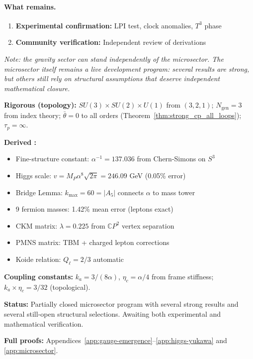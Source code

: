 \paragraph{What remains.}
\begin{enumerate}
\item \textbf{Experimental confirmation:} LPI test, clock anomalies, $T^3$ phase
\item \textbf{Community verification:} Independent review of derivations
\end{enumerate}

\textit{Note: the gravity sector can stand independently of the microsector.  The microsector itself remains a live development program: several results are strong, but others still rely on structural assumptions that deserve independent mathematical closure.}

\begin{tcolorbox}[colback=green!5!white, colframe=green!60!black, title=Summary: Gauge Extension and Microsector ]
\textbf{Rigorous (topology):} $SU(3) \times SU(2) \times U(1)$ from $(3,2,1)$; $N_{\text{gen}} = 3$ from index theory; $\bar{\theta} = 0$ to all orders (Theorem~\ref{thm:strong_cp_all_loops}); $\tau_p = \infty$.

\textbf{Derived :}
\begin{itemize}[nosep]
\item Fine-structure constant: $\alpha^{-1} = 137.036$ from Chern-Simons on $S^3$
\item Higgs scale: $v = M_P \alpha^8 \sqrt{2\pi} = 246.09$ GeV (0.05\% error)
\item Bridge Lemma: $k_{\max} = 60 = |A_5|$ connects $\alpha$ to mass tower
\item 9 fermion masses: 1.42\% mean error (leptons exact)
\item CKM matrix: $\lambda = 0.225$ from $\mathbb{C}P^2$ vertex separation
\item PMNS matrix: TBM + charged lepton corrections
\item Koide relation: $Q_\ell = 2/3$ automatic
\end{itemize}

\textbf{Coupling constants:} $k_a = 3/(8\alpha)$, $\eta_c = \alpha/4$ from frame stiffness; $k_a \times \eta_c = 3/32$ (topological).

\textbf{Status:} Partially closed microsector program with several strong results and several still-open structural selections. Awaiting both experimental and mathematical verification.

\textbf{Full proofs:} Appendices~\ref{app:gauge-emergence}--\ref{app:higgs-yukawa} and \ref{app:microsector}.
\end{tcolorbox}
